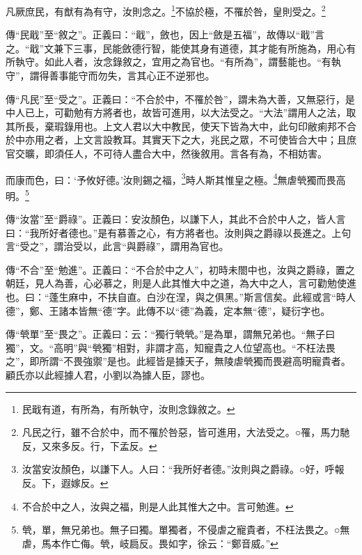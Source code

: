 凡厥庶民，有猷有為有守，汝則念之。\footnote{民戢有道，有所為，有所執守，汝則念錄敘之。}不協於極，不罹於咎，皇則受之。\footnote{凡民之行，雖不合於中，而不罹於咎惡，皆可進用，大法受之。○罹，馬力馳反，又來多反。行，下孟反。}


{\noindent\zhuan{}\fzbyks 傳“民戢”至“敘之”。正義曰：“戢”，斂也，因上“斂是五福”，故傳以“戢”言之。“戢”文兼下三事，民能斂德行智，能使其身有道德，其才能有所施為，用心有所執守。如此人者，汝念錄敘之，宜用之為官也。“有所為”，謂藝能也。“有執守”，謂得善事能守而勿失，言其心正不逆邪也。 \par}

{\noindent\zhuan{}\fzbyks 傳“凡民”至“受之”。正義曰：“不合於中，不罹於咎”，謂未為大善，又無惡行，是中人已上，可勸勉有方將者也，故皆可進用，以大法受之。“大法”謂用人之法，取其所長，棄瑕錄用也。上文人君以大中教民，使天下皆為大中，此句印敝痢邦不合於中亦用之者，上文言設教耳。其實天下之大，兆民之眾，不可使皆合大中；且庶官交曠，即須任人，不可待人盡合大中，然後敘用。言各有為，不相妨害。 \par}

而康而色，曰：‘予攸好德。’汝則錫之福，\footnote{汝當安汝顏色，以謙下人。人曰：“我所好者德。”汝則與之爵祿。○好，呼報反。下，遐嫁反。}時人斯其惟皇之極。\footnote{不合於中之人，汝與之福，則是人此其惟大之中。言可勉進。}無虐煢獨而畏高明。\footnote{煢，單，無兄弟也。無子曰獨。單獨者，不侵虐之寵貴者，不枉法畏之。○無虐，馬本作亡侮。煢，岐扃反。畏如字，徐云：“鄭音威。”}

{\noindent\zhuan{}\fzbyks 傳“汝當”至“爵祿”。正義曰：安汝顏色，以謙下人，其此不合於中人之，皆人言曰：“我所好者德也。”是有慕善之心，有方將者也。汝則與之爵祿以長進之。上句言“受之”，謂治受以，此言“與爵祿”，謂用為官也。 \par}

{\noindent\zhuan{}\fzbyks 傳“不合”至“勉進”。正義曰：“不合於中之人”，初時未閤中也，汝與之爵祿，置之朝廷，見人為善，心必慕之，則是人此其惟大中之道，為大中之人，言可勸勉使進也。曰：“蓬生麻中，不扶自直。白沙在涅，與之俱黑。”斯言信矣。此經或言“時人德”，鄭、王諸本皆無“德”字。此傳不以“德”為義，定本無“德”，疑衍字也。 \par}

{\noindent\zhuan{}\fzbyks 傳“煢單”至“畏之”。正義曰：云：“獨行煢煢。”是為單，謂無兄弟也。“無子曰獨”，文。“高明”與“煢獨”相對，非謂才高，知寵貴之人位望高也。“不枉法畏之”，即所謂“不畏強禦”是也。此經皆是據天子，無陵虐煢獨而畏避高明寵貴者。顧氏亦以此經據人君，小劉以為據人臣，謬也。 \par}

